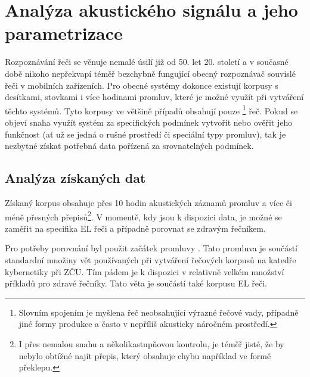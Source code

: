 \section{Analýza akustického signálu a jeho parametrizace}
\label{chap:construction:analysis}

Rozpoznávání řeči se věnuje nemalé úsilí již od 50. let 20. století a v současné době nikoho nepřekvapí téměř bezchybně fungující obecný rozpoznávač souvislé řeči v mobilních zařízeních.
Pro obecné systémy dokonce existují korpusy s desítkami, stovkami i více hodinami promluv, které je možné využít při vytváření těchto systémů.
Tyto korpusy ve většině případů obsahují pouze \footnote{Slovním spojením  je myšlena řeč neobsahující výrazné řečové vady, případně jiné formy produkce a často v nepříliš akusticky náročném prostředí.} řeč.
Pokud se objeví snaha využít systém za specifických podmínek vytvořit nebo ověřit jeho funkčnost (ať už se jedná o rušné prostředí či speciální typy promluv), tak je nezbytné získat potřebná data pořízená za srovnatelných podmínek.

\subsection{Analýza získaných dat}
\label{chap:construction:analysis:data}

Získaný korpus obsahuje přes 10 hodin akustických záznamů promluv a více či méně přesných přepisů\footnote{I přes nemalou snahu a několikastupňovou kontrolu, je téměř jisté, že by nebylo obtížné najít přepis, který obsahuje chybu například ve formě překlepu.}.
V momentě, kdy jsou k dispozici data, je možné se zaměřit na specifika EL řeči a případně porovnat se zdravým řečníkem.

Pro potřeby porovnání byl použit začátek promluvy \textit{}.
Tato promluva je součástí standardní množiny vět používaných při vytváření řečových korpusů na katedře kybernetiky při ZČU.
Tím pádem je k dispozici v relativně velkém množství příkladů pro zdravé řečníky. Tato věta je součástí také korpusu EL řeči.

